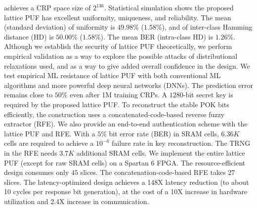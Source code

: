 \DIFaddend achieves a CRP space size of $2^{136}$.
Statistical simulation shows the proposed lattice PUF has excellent uniformity, uniqueness, and reliability.
The mean (standard deviation) of uniformity is $49.98\%$ ($1.58\%$), and of inter-class Hamming distance (HD) is $50.00\%$ ($1.58\%$).
The mean BER (intra-class HD) is $1.26\%$.
Although we establish the security of lattice PUF theoretically, we perform empirical validation as a way to explore the possible attacks of distributional relaxations used, and as a way to give added overall confidence in the design. We test empirical ML resistance of lattice PUF with both conventional ML algorithms and more powerful deep neural networks (DNNs). The prediction error remains close to $50\%$ even after 1M training CRPs.
A $1280$-bit secret key is required by the proposed lattice PUF.
To reconstruct the stable POK bits efficiently, the construction uses a concatenated-code-based reverse fuzzy extractor (RFE). 
We also provide an end-to-end authentication scheme with the lattice PUF and RFE.
With a $5\%$ bit error rate (BER) in SRAM cells, $6.36K$ cells are required to achieve a $10^{-6}$ failure rate in key reconstruction.
The TRNG in the RFE needs $3.7K$ additional SRAM cells. 
We implement the entire lattice PUF (except for raw SRAM cells) on a Spartan 6 FPGA.
The resource-efficient design consumes only $45$ slices. 
The concatenation-code-based RFE takes $27$ slices. 
The latency-optimized design achieves a 148X latency reduction (to about 10 cycles per response bit generation), at the cost of a 10X increase in hardware utilization and 2.4X increase in communication.